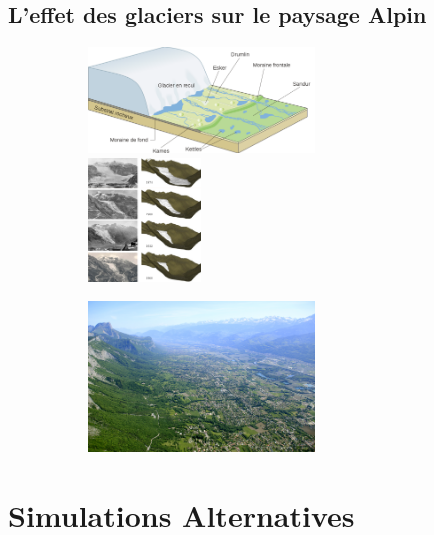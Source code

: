 \documentclass{beamer}
\begin{document}
\subsection{L'effet des glaciers sur le paysage Alpin}
\begin{frame}
	\begin{center}
		\begin{figure}
		\begin{figure}
			\includegraphics[width=6cm]{Images/Images_Alexis/glacier_reculon.png}
			\includegraphics[width=3cm]{Images/Images_Alexis/glaciers_img3.png}
		\end{figure}
		\caption{Les ères glaciaires successives ont grandement participé au façonnage de nos paysages.}
		\begin{figure}
			\includegraphics[width=6cm]{Images/Images_Alexis/gresivaudan.jpg}
		\end{figure}
		\end{figure}
	\end{center}
\end{frame}


\section{Simulations Alternatives}
\end{document}
